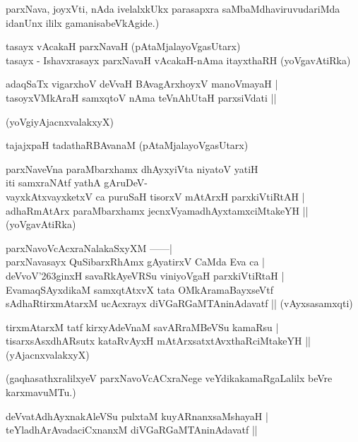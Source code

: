 parxNava, joyxVti, nAda ivelalxkUkx parasapxra saMbaMdhaviruvudariMda idanUnx ililx gamanisabeVkAgide.)
\begin{itemize}
{\bf 
\item[23.] tasayx vAcakaH parxNavaH (pAtaMjalayoVgasUtarx)\\\label{147}
tasayx - Ishavxrasayx parxNavaH vAcakaH-nAma itayxthaRH 
\hfill{(yoVgavAtiRka)}
\item[24.] adaqSaTx vigarxhoV deVvaH BAvagArxhoyxV manoVmayaH |\\\label{147a}
tasoyxVMkAraH samxqtoV nAma teVnAhUtaH parxsiVdati ||

\hfill{(yoVgiyAjacnxvalakxyX)}
\item[25.] tajajxpaH tadathaRBAvanaM \hfill{(pAtaMjalayoVgasUtarx)}\label{147b}
\item[26.] parxNaveVna paraMbarxhamx dhAyxyiVta niyatoV yatiH\\\label{147c}
iti samxraNAtf yathA gAruDeV-\\
vayxkAtxvayxketxV ca puruSaH tisorxV mAtArxH parxkiVtiRtAH |\\
adhaRmAtArx paraMbarxhamx jecnxVyamadhAyxtamxciMtakeYH ||
\hfill{(yoVgavAtiRka)}
\item[27.] parxNavoVcAcxraNalakaSxyXM ------|\\\label{147d}
parxNavasayx QuSibarxRhAmx gAyatirxV CaMda Eva ca |\\
deVvoV\char'263ginxH savaRkAyeVRSu viniyoVgaH parxkiVtiRtaH |\\
EvamaqSAyxdikaM samxqtAtxvX tata OMkAramaBayxseVtf\\
sAdhaRtirxmAtarxM ucAcxrayx diVGaRGaMTAninAdavatf ||
\hfill{(vAyxsasamxqti)}

\item[28.] tirxmAtarxM tatf kirxyAdeVnaM savARraMBeVSu kamaRsu |\\\label{147e}
tisarxsAsxdhARsutx kataRvAyxH mAtArxsatxtAvxthaRciMtakeYH ||
\hfill{(yAjacnxvalakxyX)}}
\end{itemize}

\noindent
(gaqhasathxralilxyeV parxNavoVcACxraNege veYdikakamaRgaLalilx beVre karxmavuMTu.)

\begin{itemize}
{\bf 
\item[29.] deVvatAdhAyxnakAleVSu pulxtaM kuyARnanxsaMshayaH |\\\label{148}
teYladhArAvadaciCxnanxM diVGaRGaMTAninAdavatf ||}
\end{itemize}


